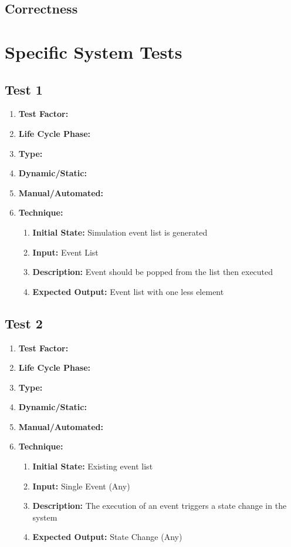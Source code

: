 \documentclass[paper=letter, fontsize=10pt]{scrartcl}
\numberwithin{equation}{section}		%
\numberwithin{figure}{section}			%
\numberwithin{table}{section}				%
\begin{document}
\subsection{Correctness}

\section{Specific System Tests}
\subsection{Test 1}
\begin{enumerate}[a]
	\item \textbf{Test Factor:}  
	\item \textbf{Life Cycle Phase:}
	\item \textbf{Type:}
	\item \textbf{Dynamic/Static:}
	\item \textbf{Manual/Automated:}
	\item \textbf{Technique:}
		\begin{enumerate}[i]
			\item \textbf{Initial State:} Simulation event list is generated			
			\item \textbf{Input:} Event List
			\item \textbf{Description:} Event should be popped from the list then executed  
			\item \textbf{Expected Output:} Event list with one less element
		\end{enumerate}
\end{enumerate}

\subsection{Test 2}
\begin{enumerate}[a]
	\item \textbf{Test Factor:}  
	\item \textbf{Life Cycle Phase:}
	\item \textbf{Type:}
	\item \textbf{Dynamic/Static:}
	\item \textbf{Manual/Automated:}
	\item \textbf{Technique:}
		\begin{enumerate}[i]
			\item \textbf{Initial State:} Existing event list
			\item \textbf{Input:} Single Event (Any)
			\item \textbf{Description:} The execution of an event triggers a state change in the system
			\item \textbf{Expected Output:} State Change (Any)
		\end{enumerate}
\end{enumerate}
\end{document}
